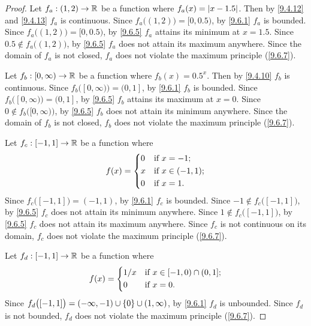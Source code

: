 \begin{proof}
  Let \(f_a : (1, 2) \to \mathbb{R}\) be a function where \(f_a(x) = \left\lvert x - 1.5\right\rvert\).
  Then by \cref{9.4.12} and \cref{9.4.13} \(f_a\) is continuous.
  Since \(f_a\big((1, 2)\big) = [0, 0.5)\), by \cref{9.6.1} \(f_a\) is bounded.
  Since \(f_a\big((1, 2)\big) = [0, 0.5)\), by \cref{9.6.5} \(f_a\) attains its minimum at \(x = 1.5\).
  Since \(0.5 \notin f_a\big((1, 2)\big)\), by \cref{9.6.5} \(f_a\) does not attain its maximum anywhere.
  Since the domain of \(f_a\) is not closed, \(f_a\) does not violate the maximum principle (\cref{9.6.7}).

  Let \(f_b : [0, \infty) \to \mathbb{R}\) be a function where \(f_b(x) = 0.5^x\).
  Then by \cref{9.4.10} \(f_b\) is continuous.
  Since \(f_b\big([0, \infty)\big) = (0, 1]\), by \cref{9.6.1} \(f_b\) is bounded.
  Since \(f_b\big([0, \infty)\big) = (0, 1]\), by \cref{9.6.5} \(f_b\) attains its maximum at \(x = 0\).
  Since \(0 \notin f_b\big([0, \infty)\big)\), by \cref{9.6.5} \(f_b\) does not attain its minimum anywhere.
  Since the domain of \(f_b\) is not closed, \(f_b\) does not violate the maximum principle (\cref{9.6.7}).

  Let \(f_c : [-1, 1] \to \mathbb{R}\) be a function where
  \[
    f(x) = \begin{dcases}
      0 & \text{if } x = -1;        \\
      x & \text{if } x \in (-1, 1); \\
      0 & \text{if } x = 1.
    \end{dcases}
  \]
  Since \(f_c\big([-1, 1]\big) = (-1, 1)\), by \cref{9.6.1} \(f_c\) is bounded.
  Since \(-1 \notin f_c\big([-1, 1]\big)\), by \cref{9.6.5} \(f_c\) does not attain its minimum anywhere.
  Since \(1 \notin f_c\big([-1, 1]\big)\), by \cref{9.6.5} \(f_c\) does not attain its maximum anywhere.
  Since \(f_c\) is not continuous on its domain, \(f_c\) does not violate the maximum principle (\cref{9.6.7}).

  Let \(f_d : [-1, 1] \to \mathbb{R}\) be a function where
  \[
    f(x) = \begin{dcases}
      1 / x & \text{if } x \in [-1, 0) \cap (0, 1]; \\
      0     & \text{if } x = 0.
    \end{dcases}
  \]
  Since \(f_d\big([-1, 1]\big) = (-\infty, -1) \cup \left\lbrace0\right\rbrace \cup (1, \infty)\), by \cref{9.6.1} \(f_d\) is unbounded.
  Since \(f_d\) is not bounded, \(f_d\) does not violate the maximum principle (\cref{9.6.7}).
\end{proof}


